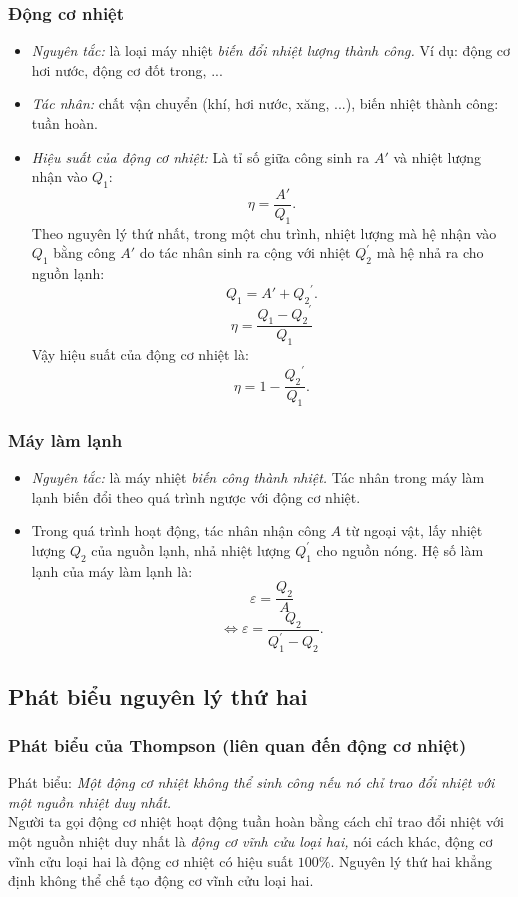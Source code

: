 \subsubsection{Động cơ nhiệt}
\begin{itemize}
\item \textit{Nguyên tắc:} là loại máy nhiệt \textit{biến đổi nhiệt lượng thành công.} Ví dụ: động cơ hơi nước, động cơ đốt trong, ...
\item \textit{Tác nhân:} chất vận chuyển (khí, hơi nước, xăng, ...), biến nhiệt thành công: tuần hoàn.
\item \textit{Hiệu suất của động cơ nhiệt:} Là tỉ số giữa công sinh ra $A'$ và nhiệt lượng nhận vào $Q_1:$
$$\eta  = \frac{{A'}}{{{Q_1}}}.$$
Theo nguyên lý thứ nhất, trong một chu trình, nhiệt lượng mà hệ nhận vào $Q_1$ bằng công $A'$ do tác nhân sinh ra cộng với nhiệt $Q_2 ^\prime$ mà hệ nhả ra cho nguồn lạnh:
$${Q_1} = A' + {Q_2}^\prime .$$
$$\eta  = \frac{{{Q_1} - {Q_2}^\prime }}{{{Q_1}}}$$
Vậy hiệu suất của động cơ nhiệt là:
$$\eta  = 1 - \frac{{{Q_2}^\prime }}{{{Q_1}}}.$$
\end{itemize}
\subsubsection{Máy làm lạnh}
\begin{itemize}
\item \textit{Nguyên tắc:} là máy nhiệt \textit{biến công thành nhiệt.} Tác nhân trong máy làm lạnh biến đổi theo quá trình ngược với động cơ nhiệt.
\item Trong quá trình hoạt động, tác nhân nhận công $A$ từ ngoại vật, lấy nhiệt lượng $Q_2$ của nguồn lạnh, nhả nhiệt lượng $Q_1 ^\prime$ cho nguồn nóng. Hệ số làm lạnh của máy làm lạnh là:
$$\varepsilon = \frac{Q_2}{A}$$
$$\Leftrightarrow \varepsilon = \frac{Q_2}{Q_1 ^\prime - Q_2}.$$
\end{itemize}
\subsection{Phát biểu nguyên lý thứ hai}
\subsubsection{Phát biểu của Thompson (liên quan đến động cơ nhiệt)}
Phát biểu: \textit{Một động cơ nhiệt không thể sinh công nếu nó chỉ trao đổi nhiệt với một nguồn nhiệt duy nhất.}\\
Người ta gọi động cơ nhiệt hoạt động tuần hoàn bằng cách chỉ trao đổi nhiệt với một nguồn nhiệt duy nhất là \textit{động cơ vĩnh cửu loại hai,} nói cách khác, động cơ vĩnh cửu loại hai là động cơ nhiệt có hiệu suất $100 \%.$ Nguyên lý thứ hai khẳng định không thể chế tạo động cơ vĩnh cửu loại hai.

